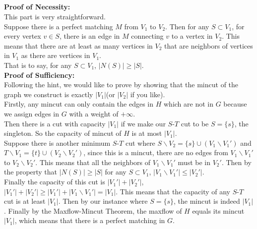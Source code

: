 \documentclass[12pt,letterpaper]{article}
\begin{document}
\subsection{}
\textbf{Proof of Necessity:}\\
This part is very straightforward.\\
Suppose there is a perfect matching $M$ from $V_1$ to $V_2$.
Then for any $S\subset V_1$, 
for every vertex $v\in S$,
there is an edge in $M$ connecting $v$ to a vertex in $V_2$.
This means that there are at least as many vertices in $V_2$ that are neighbors of vertices in $V_1$
as there are vertices in $V_1$.\\
That is to say, for any $S\subset V_1$,
$|N(S)|\geq|S|$.\\
\textbf{Proof of Sufficiency:}\\
Following the hint, we would like to prove by showing that the mincut 
of the graph we construct is exactly $|V_1|$(or $|V_2|$ if you like).\\
Firstly, any mincut can only contain the edges in $H$ which are not in $G$
because we assign edges in $G$ with a weight of $+\infty$.\\
Then there is a cut with capacity $|V_1|$ 
if we make our $S$-$T$ cut to be $S=\{s\}$, the singleton.
So the capacity of mincut of $H$ is at most $|V_1|$.\\
Suppose there is another minimum $S$-$T$ cut where $S\backslash V_2=\{s\}\cup (V_1\backslash V_1')$
and $T\backslash V_1=\{t\}\cup (V_2\backslash V_2')$,
since this is a mincut, 
there are no edges from $V_1\backslash V_1'$ to $V_2\backslash V_2'$.
This means that all the neighbors of $V_1\backslash V_1'$ must be in $V_2'$.
Then by the property that $|N(S)|\geq |S|$ for any $S\subset V_1$,
$|V_1\backslash V_1'|\leq |V_2'|$.\\
Finally the capacity of this cut is $|V_1'|+|V_2'|$,
$|V_1'|+|V_2'|\geq |V_1'|+|V_1\backslash V_1'|=|V_1|$.
This means that the capacity of any $S$-$T$ cut is at least $|V_1|$.
Then by our instance where $S=\{s\}$, the mincut is indeed $|V_1|$.
Finally by the Maxflow-Mincut Theorem, 
the maxflow of $H$ equals its mincut $|V_1|$,
which means that there is a perfect matching in $G$.
 
\newpage
\end{document}
